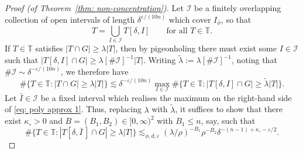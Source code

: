 \documentclass[reqno]{amsart}
\numberwithin{equation}{section}
\newcommand{\T}{\mathbb{T}}
\newcommand{\cI}{\mathcal{I}}
\theoremstyle{plain}
\theoremstyle{definition}
\begin{document}
\begin{proof}[Proof (of Theorem~\ref{thm: non-concentration})]
Let $\cI$ be a finitely overlapping collection of open intervals of length $\delta^{\varepsilon/(10n)}$ which cover $I_{\phi}$, so that 
\begin{equation*}
    T = \bigcup_{I \in \cI} T[\delta, I] \qquad \textrm{for all $T \in \T$.}
\end{equation*}
    If $T \in \T$ satisfies $|T \cap G| \geq \lambda |T|$, then by pigeonholing there must exist some $I \in \cI$ such that $|T[\delta, I] \cap G| \geq \lambda [\#\cI]^{-1}|T|$. Writing $\tilde{\lambda} := \lambda [\#\cI]^{-1}$, noting that $\#\cI \sim \delta^{-\varepsilon/(10n)}$, we therefore have
\begin{equation}\label{eq: poly approx 1}
   \#\{T \in \T : |T \cap G| \geq \lambda |T| \} \lesssim \delta^{-\varepsilon/(10n)} \max_{I \in \cI} \#\{T \in \T : |T[\delta, I] \cap G| \geq \tilde{\lambda} |T| \}.
\end{equation}
Let $\bar{I} \in \cI$ be a fixed interval which realises the maximum on the right-hand side of \eqref{eq: poly approx 1}. Thus, replacing $\lambda$ with $\tilde{\lambda}$, it suffices to show that there exist $\kappa_{\circ} > 0$ and $B = (B_1, B_2) \in [0,\infty)^2$ with $B_1 \leq n$, say, such that
\begin{equation*}
    \#\{T \in \T : |T[\delta, \bar{I}\,] \cap G| \geq \lambda |T| \} \lesssim_{\phi, d, \varepsilon} (\lambda/\rho)^{-B_1} \rho^{-B_2} \delta^{-(n-1) + \kappa_{\circ} - \varepsilon/2}.
\end{equation*}


\end{proof}
\end{document}
